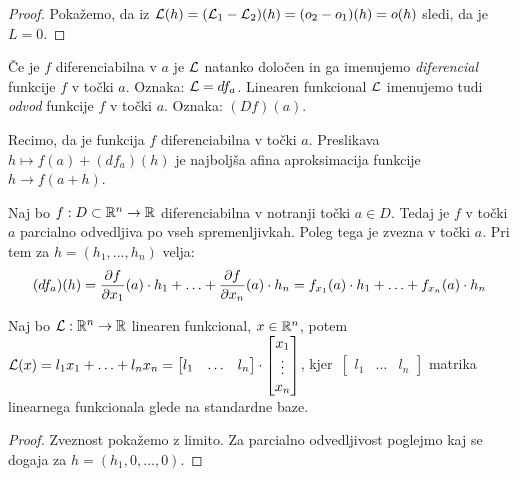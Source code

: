 \begin{proof}
    Pokažemo, da iz $\mathcal{L}(h) = (\mathcal{L}_1 - \mathcal{L}_2)(h) = (o_2 - o_1)(h) = o(h)$ sledi, da je $L = 0$.
\end{proof}

\begin{definicija}
    Če je $f$ diferenciabilna v $a$ je $\mathcal{L}$ natanko določen in ga imenujemo \emph{diferencial} funkcije $f$ v točki $a$. Oznaka: $\mathcal{L} = df_a$. Linearen funkcional $\mathcal{L}$ imenujemo tudi \emph{odvod} funkcije $f$ v točki $a$. Oznaka: $(Df)(a)$.
\end{definicija}

\begin{opomba}
    Recimo, da je funkcija $f$ diferenciabilna v točki $a$. Preslikava $h \mapsto f(a) + (df_a)(h)$ je najboljša afina aproksimacija funkcije $h \to f(a+h)$.
\end{opomba}

\begin{trditev}
    Naj bo $f: D \subset \mathbb{R}^n \to \mathbb{R}$ diferenciabilna v notranji točki $a \in D$. Tedaj je $f$ v točki $a$ parcialno odvedljiva po vseh spremenljivkah. Poleg tega je zvezna v točki $a$. Pri tem za $h = (h_1, \ldots, h_n)$ velja:
    $$(df_a)(h) = \frac{\partial f}{\partial x_1}(a) \cdot h_1 + \ldots + \frac{\partial f}{\partial x_n}(a) \cdot h_n = f_{x_1}(a) \cdot h_1 + \ldots + f_{x_n}(a) \cdot h_n$$
\end{trditev}

\begin{opomba}
    Naj bo $\mathcal{L}: \mathbb{R}^n \to \mathbb{R}$ linearen funkcional, $x \in \mathbb{R}^n$, potem $\mathcal{L}(x) = l_1x_1+\ldots+l_nx_n = \begin{bmatrix}
        l_1 & \ldots & l_n
    \end{bmatrix} \cdot \begin{bmatrix}
        x_1 \\ \vdots \\ x_n
    \end{bmatrix}$, kjer~$\begin{bmatrix}
        l_1 & \ldots & l_n
    \end{bmatrix}$ matrika linearnega funkcionala glede na standardne baze.    
\end{opomba}

\begin{proof}
    Zveznost pokažemo z limito. Za parcialno odvedljivost poglejmo kaj se dogaja za $h = (h_1, 0, \ldots, 0)$.
\end{proof}

